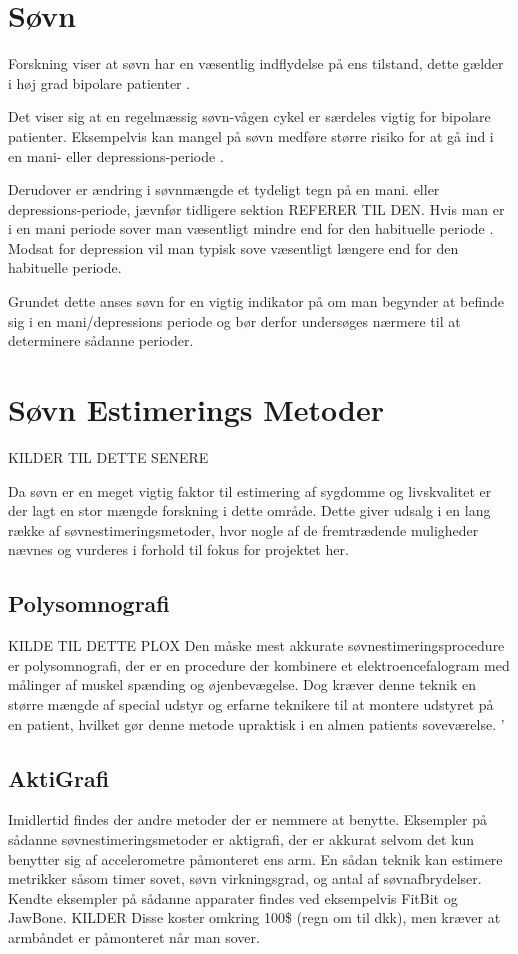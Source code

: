 \section{Søvn}
Forskning viser at søvn har en væsentlig indflydelse på ens tilstand, dette gælder i høj grad bipolare patienter \citep{CPSP:CPSP1164}.

Det viser sig at en regelmæssig søvn-vågen cykel er særdeles vigtig for bipolare patienter.
Eksempelvis kan mangel på søvn medføre større risiko for at gå ind i en mani- eller depressions-periode \citep{CPSP:CPSP1164}.

Derudover er ændring i søvnmængde et tydeligt tegn på en mani. eller depressions-periode, jævnfør tidligere sektion REFERER TIL DEN.
Hvis man er i en mani periode sover man væsentligt mindre end for den habituelle periode \citep{CPSP:CPSP1164}.
Modsat for depression vil man typisk sove væsentligt længere end for den habituelle periode.

Grundet dette anses søvn for en vigtig indikator på om man begynder at befinde sig i en mani/depressions periode og bør derfor undersøges nærmere til at determinere sådanne perioder.

\section{Søvn Estimerings Metoder}
KILDER TIL DETTE SENERE

Da søvn er en meget vigtig faktor til estimering af sygdomme og livskvalitet er der lagt en stor mængde forskning i dette område.
Dette giver udsalg i en lang række af søvnestimeringsmetoder, hvor nogle af de fremtrædende muligheder nævnes og vurderes i forhold til fokus for projektet her.

\subsection{Polysomnografi}
KILDE TIL DETTE PLOX
Den måske mest akkurate søvnestimeringsprocedure er polysomnografi, der er en procedure der kombinere et elektroencefalogram med målinger af muskel spænding og øjenbevægelse.
Dog kræver denne teknik en større mængde af special udstyr og erfarne teknikere til at montere udstyret på en patient, hvilket gør denne metode upraktisk i en almen patients soveværelse.
'
\subsection{AktiGrafi}
Imidlertid findes der andre metoder der er nemmere at benytte.
Eksempler på sådanne søvnestimeringsmetoder er aktigrafi, der er akkurat selvom det kun benytter sig af accelerometre påmonteret ens arm.
En sådan teknik kan estimere metrikker såsom timer sovet, søvn virkningsgrad, og antal af søvnafbrydelser.
Kendte eksempler på sådanne apparater findes ved eksempelvis FitBit og JawBone. KILDER
Disse koster omkring 100\$ (regn om til dkk), men kræver at armbåndet er påmonteret når man sover.

